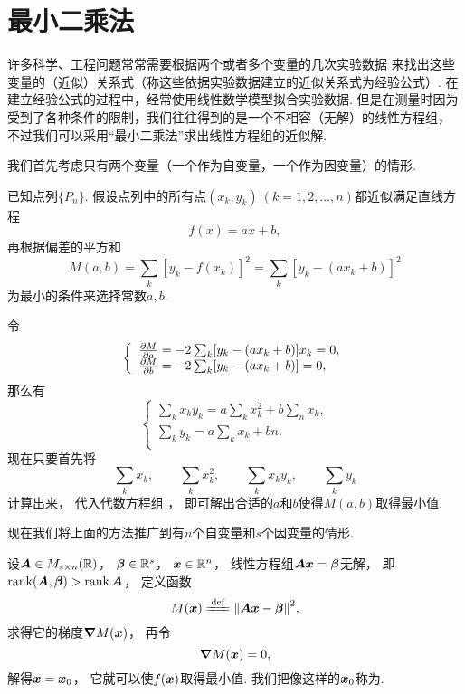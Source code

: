 \section{最小二乘法}
许多科学、工程问题常常需要根据两个或者多个变量的几次实验数据
来找出这些变量的（近似）关系式（称这些依据实验数据建立的近似关系式为经验公式）.
在建立经验公式的过程中，经常使用线性数学模型拟合实验数据.
但是在测量时因为受到了各种条件的限制，我们往往得到的是一个不相容（无解）的线性方程组，
不过我们可以采用“最小二乘法”求出线性方程组的近似解.

我们首先考虑只有两个变量（一个作为自变量，一个作为因变量）的情形.

已知点列\(\{P_n\}\).
假设点列中的所有点\((x_k,y_k)\ (k=1,2,\dotsc,n)\)都近似满足直线方程\[
	f(x) = a x + b,
\]
再根据偏差的平方和\[
	M(a,b) = \sum_k [y_k - f(x_k)]^2 = \sum_k [y_k - (a x_k + b)]^2
\]为最小的条件来选择常数\(a,b\).

令\[
	\left\{ \begin{array}{l}
		\pdv{M}{a} = -2 \sum_k [y_k - (a x_k + b)] x_k = 0, \\
		\pdv{M}{b} = -2 \sum_k [y_k - (a x_k + b)] = 0,
	\end{array} \right.
\]
那么有\begin{equation}\label{equation:最小二乘法.关于a和b的代数方程组}
	\left\{ \begin{array}{l}
		\sum_k x_k y_k = a \sum_k x_k^2 + b \sum_n x_k, \\
		\sum_k y_k = a \sum_k x_k + b n. \\
	\end{array} \right.
\end{equation}
现在只要首先将\[
	\sum_k x_k, \qquad
	\sum_k x_k^2, \qquad
	\sum_k x_k y_k, \qquad
	\sum_k y_k
\]计算出来，
代入代数方程组 ，
即可解出合适的\(a\)和\(b\)使得\(M(a,b)\)取得最小值.

现在我们将上面的方法推广到有\(n\)个自变量和\(s\)个因变量的情形.

设\(\boldsymbol{A} \in M_{s \times n}(\mathbb{R})\)，
\(\boldsymbol{\beta} \in \mathbb{R}^s\)，
\(\boldsymbol{x} \in \mathbb{R}^n\)，
线性方程组\(\boldsymbol{A}\boldsymbol{x}=\boldsymbol{\beta}\)无解，
即\(\rank(\boldsymbol{A},\boldsymbol{\beta})>\rank\boldsymbol{A}\)，
定义函数\[
	M(\vb{x})
	\defeq
	\norm{\vb{A}\vb{x}-\vb{\beta}}^2,
\]
求得它的梯度\(\grad M(\boldsymbol{x})\)，
再令\[
	\grad M(\boldsymbol{x}) = 0,
\]
解得\(\boldsymbol{x}=\boldsymbol{x}_0\)，
它就可以使\(f(\boldsymbol{x})\)取得最小值.
我们把像这样的\(\boldsymbol{x}_0\)称为.

\endgroup

